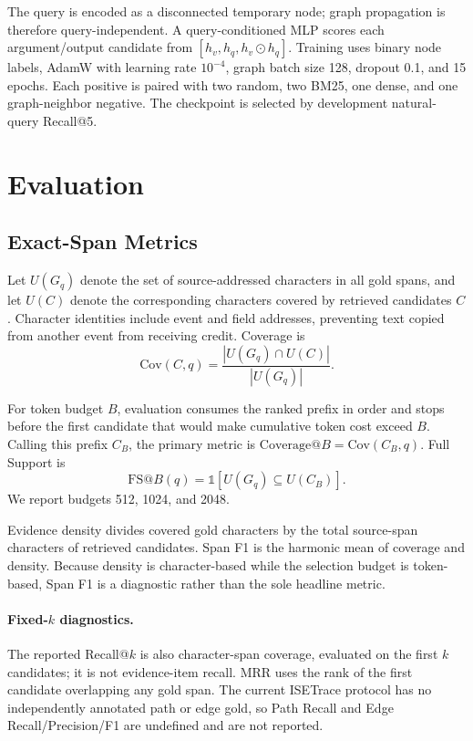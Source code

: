 \documentclass[sigconf,anonymous,review]{acmart}
\begin{document}
The query is encoded as a disconnected temporary node; graph propagation is therefore query-independent. A query-conditioned MLP scores each argument/output candidate from $[h_v,h_q,h_v\odot h_q]$. Training uses binary node labels, AdamW with learning rate $10^{-4}$, graph batch size 128, dropout 0.1, and 15 epochs. Each positive is paired with two random, two BM25, one dense, and one graph-neighbor negative. The checkpoint is selected by development natural-query Recall@5.

\section{Evaluation}
\label{sec:evaluation}

\subsection{Exact-Span Metrics}

Let $U(G_q)$ denote the set of source-addressed characters in all gold spans, and let $U(C)$ denote the corresponding characters covered by retrieved candidates $C$. Character identities include event and field addresses, preventing text copied from another event from receiving credit. Coverage is
\begin{equation}
\mathrm{Cov}(C,q)=\frac{|U(G_q)\cap U(C)|}{|U(G_q)|}.
\end{equation}

For token budget $B$, evaluation consumes the ranked prefix in order and stops before the first candidate that would make cumulative token cost exceed $B$. Calling this prefix $C_B$, the primary metric is $\mathrm{Coverage}@B=\mathrm{Cov}(C_B,q)$. Full Support is
\begin{equation}
\mathrm{FS}@B(q)=\mathbb{1}[U(G_q)\subseteq U(C_B)].
\end{equation}
We report budgets 512, 1024, and 2048.

Evidence density divides covered gold characters by the total source-span characters of retrieved candidates. Span F1 is the harmonic mean of coverage and density. Because density is character-based while the selection budget is token-based, Span F1 is a diagnostic rather than the sole headline metric.

\paragraph{Fixed-$k$ diagnostics.}
The reported Recall@$k$ is also character-span coverage, evaluated on the first $k$ candidates; it is not evidence-item recall. MRR uses the rank of the first candidate overlapping any gold span. The current ISETrace protocol has no independently annotated path or edge gold, so Path Recall and Edge Recall/Precision/F1 are undefined and are not reported.
\end{document}
